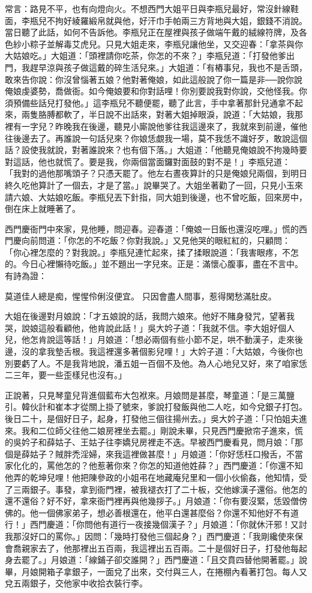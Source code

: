 常言：路見不平，也有向燈向火。不想西門大姐平日與李瓶兒最好，常沒針線鞋面，李瓶兒不拘好綾羅緞帛就與他，好汗巾手帕兩三方背地與大姐，銀錢不消說。當日聽了此話，如何不告訴他。李瓶兒正在屋裡與孩子做端午戴的絨線符牌，及各色紗小粽子並解毒艾虎兒。只見大姐走來，李瓶兒讓他坐，又交迎春：「拿茶與你大姑娘吃。」大姐道：「頭裡請你吃茶，你怎的不來？」李瓶兒道：「打發他爹出門，我趕早涼與孩子做這戴的碎生活兒來。」大姐道：「有樁事兒，我也不是舌頭，敢來告你說：你沒曾惱著五娘？他對著俺娘，如此這般說了你一篇是非──說你說俺娘虔婆勢，喬做衙。如今俺娘要和你對話哩！你別要說我對你說，交他怪我。你須預備些話兒打發他。」這李瓶兒不聽便罷，聽了此言，手中拿著那針兒通拿不起來，兩隻胳膊都軟了，半日說不出話來，對著大姐掉眼淚，說道：「大姑娘，我那裡有一字兒？昨晚我在後邊，聽見小廝說他爹往我這邊來了，我就來到前邊，催他往後邊去了。再誰說一句話兒來？你娘恁覷我一場，莫不我恁不識好歹，敢說這個話？設使我就說，對著誰說來？也有個下落。」大姐道：「他聽見俺娘說不拘幾時要對這話，他也就慌了。要是我，你兩個當面鑼對面鼓的對不是！」李瓶兒道： 「我對的過他那嘴頭子？只憑天罷了。他左右晝夜算計的只是俺娘兒兩個，到明日終久吃他算計了一個去，才是了當。」說畢哭了。大姐坐著勸了一回，只見小玉來請六娘、大姑娘吃飯。李瓶兒丟下針指，同大姐到後邊，也不曾吃飯，回來房中，倒在床上就睡著了。

西門慶衙門中來家，見他睡，問迎春。迎春道：「俺娘一日飯也還沒吃哩。」慌的西門慶向前問道：「你怎的不吃飯？你對我說。」又見他哭的眼紅紅的，只顧問： 「你心裡怎麼的？對我說。」李瓶兒連忙起來，揉了揉眼說道：「我害眼疼，不怎的。今日心裡懶待吃飯。」並不題出一字兒來。正是：滿懷心腹事，盡在不言中。有詩為證：

莫道佳人總是痴，惺惺伶俐沒便宜。
只因會盡人間事，惹得閑愁滿肚皮。

大姐在後邊對月娘說：「才五娘說的話，我問六娘來。他好不賭身發咒，望著我哭，說娘這般看顧他，他肯說此話！」吳大妗子道：「我就不信。李大姐好個人兒，他怎肯說這等話！」月娘道：「想必兩個有些小節不足，哄不動漢子，走來後邊，沒的拿我墊舌根。我這裡還多著個影兒哩！」大妗子道：「大姑娘，今後你也別要虧了人。不是我背地說，潘五姐一百個不及他。為人心地兒又好，來了咱家恁二三年，要一些歪樣兒也沒有。」

正說著，只見琴童兒背進個藍布大包袱來。月娘問是甚麼，琴童道：「是三萬鹽引。韓伙計和崔本才從關上掛了號來，爹說打發飯與他二人吃，如今兌銀子打包。後日二十，是個好日子，起身，打發他三個往揚州去。」吳大妗子道：「只怕姐夫進來。我和二位師父往他二娘房裡坐去罷。」剛說未畢，只見西門慶掀帘子進來，慌的吳妗子和薛姑子、王姑子往李嬌兒房裡走不迭。早被西門慶看見，問月娘：「那個是薛姑子？賊胖禿淫婦，來我這裡做甚麼！」月娘道：「你好恁枉口撥舌，不當家化化的，罵他怎的？他惹著你來？你怎的知道他姓薛？」西門慶道：「你還不知他弄的乾坤兒哩！他把陳參政的小姐弔在地藏庵兒里和一個小伙偷姦，他知情，受了三兩銀子。事發，拿到衙門裡，被我褪衣打了二十板，交他嫁漢子還俗。他怎的還不還俗？好不好，拿來衙門裡再與他幾拶子。」月娘道：「你有要沒緊，恁毀僧傍佛的。他一個佛家弟子，想必善根還在，他平白還甚麼俗？你還不知他好不有道行！」西門慶道：「你問他有道行一夜接幾個漢子？」月娘道：「你就休汗邪！又討我那沒好口的罵你。」因問：「幾時打發他三個起身？」西門慶道：「我剛纔使來保會喬親家去了，他那裡出五百兩，我這裡出五百兩。二十是個好日子，打發他每起身去罷了。」月娘道：「線鋪子卻交誰開？」西門慶道：「且交賁四替他開著罷。」說畢，月娘開箱子拿銀子，一面兌了出來，交付與三人，在捲棚內看著打包。每人又兌五兩銀子，交他家中收拾衣裝行李。

